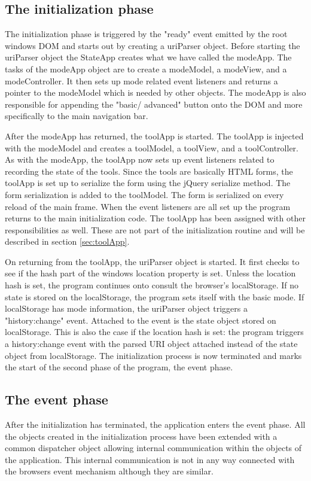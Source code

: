 \documentclass[english]{ifimaster}
\begin{document}
\subsection{The initialization phase} 
The initialization phase is triggered by the "ready" event emitted by the root windows DOM and starts out by creating a uriParser object. Before starting the uriParser object the StateApp creates what we have called the modeApp. The tasks of the modeApp object are to create a modeModel, a modeView, and a modeController. It then sets up mode related event listeners and returns a pointer to the modeModel which is needed by other objects. The modeApp is also responsible for appending the "basic/ advanced" button onto the DOM and more specifically to the main navigation bar.

After the modeApp has returned, the toolApp is started. The toolApp is injected with the modeModel and creates a toolModel, a toolView, and a toolController. As with the modeApp, the toolApp now sets up event listeners related to recording the state of the tools. Since the tools are basically HTML forms, the toolApp is set up to serialize the form using the jQuery serialize method. The form serialization is added to the toolModel. The form is serialized on every reload of the main frame. When the event listeners are all set up the program returns to the main initialization code. The toolApp has been assigned with other responsibilities as well. These are not part of the initialization routine and will be described in section \ref{sec:toolApp}.

On returning from the toolApp, the uriParser object is started. It first checks to see if the hash part of the windows location property is set. Unless the location hash is set, the program continues onto consult the browser's localStorage. If no state is stored on the localStorage, the program sets itself with the basic mode. If localStorage has mode information, the uriParser object triggers a "history:change" event. Attached to the event is the state object stored on localStorage. This is also the case if the location hash is set: the program triggers a history:change event with the parsed URI object attached instead of the state object from localStorage. The initialization process is now terminated and marks the start of the second phase of the program, the event phase.



\subsection{The event phase}
After the initialization has terminated, the application enters the event phase. All the objects created in the initialization process have been extended with a common dispatcher object allowing internal communication within the objects of the application. This internal communication is not in any way connected with the browsers event mechanism although they are similar.
\end{document}
